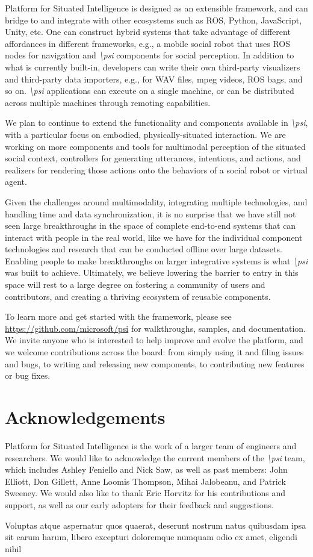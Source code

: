 \documentclass[letterpaper]{article} %
\newcommand{\psif}{\emph{\textbackslash psi} }
\newcommand{\psifnospace}{\emph{\textbackslash psi}}
\begin{document}
Platform for Situated Intelligence is designed as an extensible framework, and can bridge to and integrate with other ecosystems such as ROS, Python, JavaScript, Unity, etc. One can construct hybrid systems that take advantage of different affordances in different frameworks, e.g., a mobile social robot that uses ROS nodes for navigation and \psif components for social perception. In addition to what is currently built-in, developers can write their own third-party visualizers and third-party data importers, e.g., for WAV files, mpeg videos, ROS bags, and so on. \psif applications can execute on a single machine, or can be distributed across multiple machines through remoting capabilities.


We plan to continue to extend the functionality and components available in \psifnospace, with a particular focus on embodied, physically-situated interaction. We are working on more components and tools for multimodal perception of the situated social context, controllers for generating utterances, intentions, and actions, and realizers for rendering those actions onto the behaviors of a social robot or virtual agent.

Given the challenges around multimodality, integrating multiple technologies, and handling time and data synchronization, it is no surprise that we have still not seen large breakthroughs in the space of complete end-to-end systems that can interact with people in the real world, like we have for the individual component technologies and research that can be conducted offline over large datasets. Enabling people to make breakthroughs on larger integrative systems is what \psif was built to achieve. Ultimately, we believe lowering the barrier to entry in this space will rest to a large degree on fostering a community of users and contributors, and creating a thriving ecosystem of reusable components.

To learn more and get started with the framework, please see \textcolor{blue}{\url{https://github.com/microsoft/psi}} for walkthroughs, samples, and documentation. We invite anyone who is interested to help improve and evolve the platform, and we welcome contributions across the board: from simply using it and filing issues and bugs, to writing and releasing new components, to contributing new features or bug fixes.

\section{Acknowledgements}
Platform for Situated Intelligence is the work of a larger team of engineers and researchers. We would like to acknowledge the current members of the \psif team, which includes Ashley Feniello and Nick Saw, as well as past members: John Elliott, Don Gillett, Anne Loomis Thompson, Mihai Jalobeanu, and Patrick Sweeney. We would also like to thank Eric Horvitz for his contributions and support, as well as our early adopters for their feedback and suggestions.


Voluptas atque aspernatur quos quaerat, deserunt nostrum natus quibusdam ipsa sit earum harum, libero excepturi doloremque numquam odio ex amet, eligendi nihil

\end{document}
